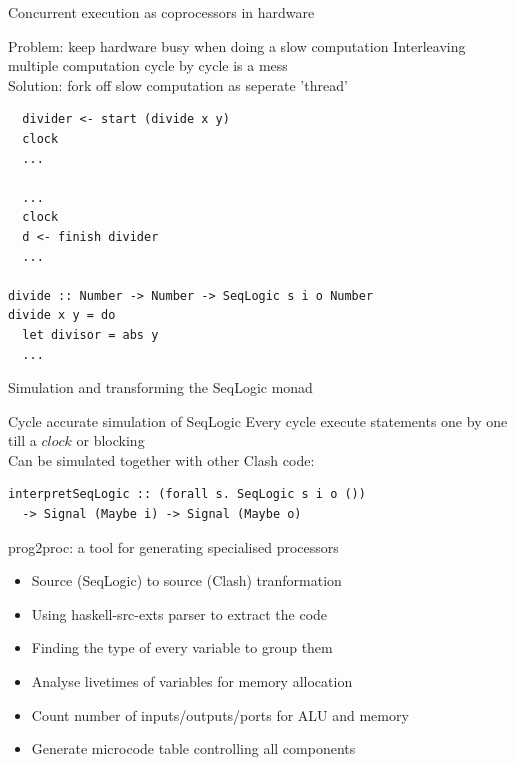 \documentclass[pdf]{beamer}
\begin{document}

\begin{frame}[fragile]{Concurrent execution as coprocessors in hardware}
\begin{block}{Problem: keep hardware busy when doing a slow computation}
Interleaving multiple computation cycle by cycle is a mess \\
Solution: fork off slow computation as seperate 'thread'
\end{block}

\begin{block}{}
\begin{small}
\begin{verbatim}
  divider <- start (divide x y)
  clock
  ...
  
  ...
  clock
  d <- finish divider
  ...

divide :: Number -> Number -> SeqLogic s i o Number
divide x y = do
  let divisor = abs y
  ...
\end{verbatim}
\end{small}
\end{block}

\end{frame}

\begin{frame}[fragile]{Simulation and transforming the SeqLogic monad}
\begin{block}{Cycle accurate simulation of SeqLogic}
Every cycle execute statements one by one till a $clock$ or blocking \\
Can be simulated together with other Clash code:
\begin{verbatim}
interpretSeqLogic :: (forall s. SeqLogic s i o ())
  -> Signal (Maybe i) -> Signal (Maybe o)
\end{verbatim}
\end{block}

\begin{block}{prog2proc: a tool for generating specialised processors}
\begin{itemize}
\item Source (SeqLogic) to source (Clash) tranformation
\item Using haskell-src-exts parser to extract the code
\item Finding the type of every variable to group them
\item Analyse livetimes of variables for memory allocation
\item Count number of inputs/outputs/ports for ALU and memory
\item Generate microcode table controlling all components
\end{itemize}
\end{block}

\end{frame}
\end{document}
